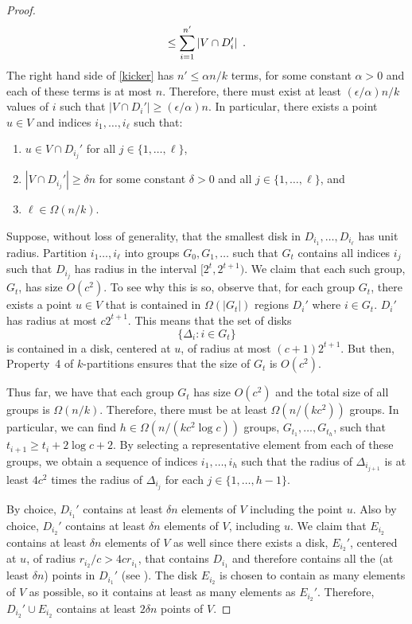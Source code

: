 \documentclass{patmorin}
\begin{document}
\begin{proof}
\begin{equation}
         \le \sum_{i=1}^{n'} |V\cap D_i'| \enspace . \eqlabel{kicker}
   \end{equation}
   The right hand side of \eqref{kicker} has $n'\le \alpha n/k$
   terms, for some constant $\alpha >0$ and each of these terms
   is at most $n$.  Therefore, there must exist at least
   $(\epsilon/\alpha)n/k$ values of $i$ such that $|V\cap D_i'|\ge
   (\epsilon/\alpha)n$.  In particular, there exists a point $u\in V$
   and indices $i_1,\ldots,i_\ell$ such that:
   \begin{enumerate}
     \item $u\in V\cap D_{i_j}'$ for all $j\in\{1,\ldots,\ell\}$,
     \item $|V\cap D_{i_j}'|\ge \delta n$ for some constant $\delta>0$
       and all $j\in\{1,\ldots,\ell\}$, and
     \item $\ell\in\Omega(n/k)$.
   \end{enumerate}

   Suppose, without loss of generality, that the smallest disk
   in $D_{i_1},\ldots,D_{i_\ell}$ has unit radius.  Partition
   $i_1\ldots,i_\ell$ into groups $G_0,G_1,\ldots$ such that $G_t$
   contains all indices $i_j$ such that $D_{i_j}$ has radius in the
   interval $[2^t,2^{t+1})$.
   We claim that each such group, $G_t$, has size $O(c^2)$.  To see
   why this is so, observe that, for each group $G_t$, there exists a
   point $u\in V$ that is contained in $\Omega(|G_t|)$ regions $D_{i}'$
   where $i\in G_t$.  $D_{i}'$ has radius at most $c2^{t+1}$.  This means
   that the set of disks
   \[
      \{ \Delta_i : i\in G_t\}
   \]
   is contained in a disk, centered at $u$, of radius at most
   $(c+1)2^{t+1}$.  But then, Property~4 of $k$-partitions ensures that
   the size of $G_t$ is $O(c^2)$.

   Thus far, we have that each group $G_t$ has size $O(c^2)$
   and the total size of all groups is $\Omega(n/k)$.
   Therefore, there must be at least $\Omega(n/(kc^2))$ groups.
   In particular, we can find $h\in\Omega(n/(kc^2\log c))$ groups,
   $G_{t_1},\ldots,G_{t_h}$, such that $t_{i+1} \ge
   t_{i}+2\log c+2$.  By selecting a representative element from each
   of these groups, we obtain a sequence of indices $i_1,\ldots,i_h$
   such that the radius of $\Delta_{i_{j+1}}$ is at least $4c^2$ times the
   radius of $\Delta_{i_j}$ for each $j\in\{1,\ldots,h-1\}$.

   By choice, $D_{i_1}'$ contains at least $\delta n$ elements of $V$
   including the point $u$.  Also by choice, $D_{i_2}'$ contains at least
   $\delta n$ elements of $V$, including $u$.  We claim that $E_{i_2}$
   contains at least $\delta n$ elements of $V$ as well since there
   exists a disk, $E_{i_2}'$, centered at $u$, of radius $r_{i_2}/c >
   4cr_{i_1}$, that contains $D_{i_1}$ and therefore contains all the
   (at least $\delta n$) points in $D_{i_1}'$ (see ).
   The disk $E_{i_2}$ is chosen to contain as many elements of $V$ as
   possible, so it contains at least as many elements as $E_{i_2}'$.
   Therefore, $D_{i_2}'\cup E_{i_2}$ contains at least $2\delta n$
   points of $V$.


\end{proof}
\end{document}

